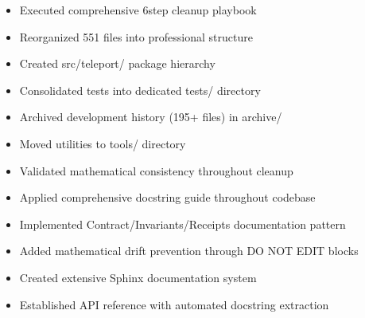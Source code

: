 \documentclass[letterpaper,10pt,english]{sphinxmanual}
\begin{document}
\sphinxAtStartPar
{}

\sphinxAtStartPar
{}
\begin{itemize}
\item {} 
\sphinxAtStartPar
Executed comprehensive 6\sphinxhyphen{}step cleanup playbook

\item {} 
\sphinxAtStartPar
Reorganized 551 files into professional structure

\item {} 
\sphinxAtStartPar
Created src/teleport/ package hierarchy

\item {} 
\sphinxAtStartPar
Consolidated tests into dedicated tests/ directory

\item {} 
\sphinxAtStartPar
Archived development history (195+ files) in archive/

\item {} 
\sphinxAtStartPar
Moved utilities to tools/ directory

\item {} 
\sphinxAtStartPar
Validated mathematical consistency throughout cleanup

\end{itemize}

\sphinxAtStartPar
{}

\sphinxAtStartPar
{}
\begin{itemize}
\item {} 
\sphinxAtStartPar
Applied comprehensive docstring guide throughout codebase

\item {} 
\sphinxAtStartPar
Implemented Contract/Invariants/Receipts documentation pattern

\item {} 
\sphinxAtStartPar
Added mathematical drift prevention through DO NOT EDIT blocks

\item {} 
\sphinxAtStartPar
Created extensive Sphinx documentation system

\item {} 
\sphinxAtStartPar
Established API reference with automated docstring extraction

\end{itemize}
\end{document}
